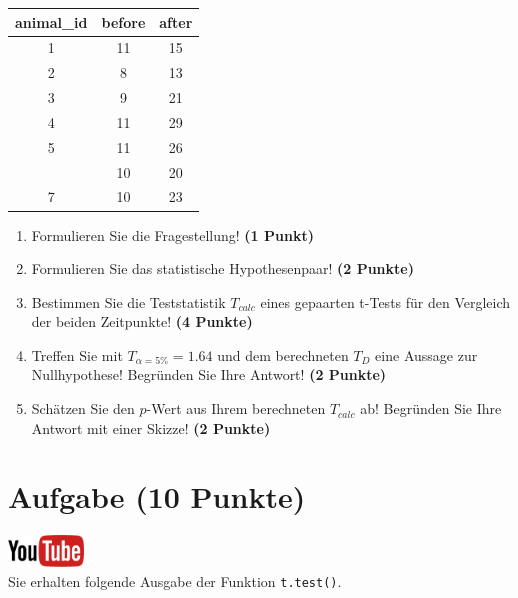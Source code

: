\documentclass[a4paper, 9pt]{scrartcl}\usepackage[]{graphicx}\usepackage[]{xcolor}
\begin{document}
\begin{table}[!h]
\centering
\begin{tabular}{ccc}
\toprule
animal\_id & before & after\\
\midrule
1 & 11 & 15\\
2 & 8 & 13\\
3 & 9 & 21\\
4 & 11 & 29\\
5 & 11 & 26\\
\addlinespace
6 & 10 & 20\\
7 & 10 & 23\\
\bottomrule
\end{tabular}
\end{table}



\begin{enumerate}
\item Formulieren Sie die Fragestellung! \textbf{(1 Punkt)}
\item Formulieren Sie das statistische Hypothesenpaar! \textbf{(2
    Punkte)}
\item Bestimmen Sie die Teststatistik $T_{calc}$ eines gepaarten t-Tests f{\"u}r den
  Vergleich der beiden Zeitpunkte! \textbf{(4 Punkte)}
\item Treffen Sie mit $T_{\alpha = 5\%} = 1.64$ und dem berechneten $T_{D}$ eine Aussage
  zur Nullhypothese! Begr{\"u}nden Sie Ihre Antwort! \textbf{(2 Punkte)}
\item Sch{\"a}tzen Sie den $p$-Wert aus Ihrem berechneten $T_{calc}$ ab!
  Begr{\"u}nden Sie Ihre Antwort mit einer Skizze! \textbf{(2
    Punkte)}
\end{enumerate} 
\clearpage

\section{Aufgabe \hfill (10 Punkte)}

\hfill\href{https://youtu.be/exDo7AyHl4Q}{\includegraphics[width =
  2cm]{img/youtube}}\\[1Ex]

Sie erhalten folgende \Rlogo Ausgabe der Funktion \texttt{t.test()}.
\end{document}

